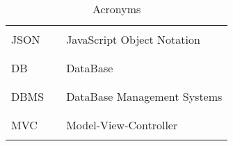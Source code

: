 \begin{table}[H]
\begin{tabular}{l l p{11cm}}
                          &        &                                                        \\\hline \\
        JSON              & \vline & JavaScript Object Notation                             \\
                          &        &                                                        \\\hline \\
        DB                & \vline & DataBase                                               \\
                          &        &                                                        \\\hline \\
        DBMS              & \vline & DataBase Management Systems                            \\
                          &        &                                                        \\\hline \\
        MVC               & \vline & Model-View-Controller                                  \\
                          &        &                                                        \\
        \hline
    \end{tabular}
    \caption{Acronyms}
\end{table}

